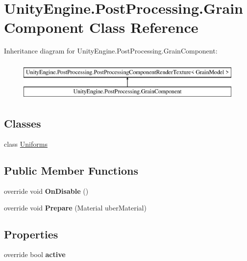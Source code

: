 \hypertarget{class_unity_engine_1_1_post_processing_1_1_grain_component}{}\section{Unity\+Engine.\+Post\+Processing.\+Grain\+Component Class Reference}
\label{class_unity_engine_1_1_post_processing_1_1_grain_component}
Inheritance diagram for Unity\+Engine.\+Post\+Processing.\+Grain\+Component\+:\begin{figure}[H]
\begin{center}
\leavevmode
\includegraphics[height=2.000000cm]{class_unity_engine_1_1_post_processing_1_1_grain_component}
\end{center}
\end{figure}
\subsection*{Classes}
\begin{DoxyCompactItemize}
\item 
class \hyperlink{class_unity_engine_1_1_post_processing_1_1_grain_component_1_1_uniforms}{Uniforms}
\end{DoxyCompactItemize}
\subsection*{Public Member Functions}
\begin{DoxyCompactItemize}
\item 
\mbox{\label{class_unity_engine_1_1_post_processing_1_1_grain_component_a345fbfa8ab350022e79fbcae210c3210}} 
override void {\bfseries On\+Disable} ()
\item 
\mbox{\label{class_unity_engine_1_1_post_processing_1_1_grain_component_a6a1c8bf2f8d860c91df6cf012c63c27a}} 
override void {\bfseries Prepare} (Material uber\+Material)
\end{DoxyCompactItemize}
\subsection*{Properties}
\begin{DoxyCompactItemize}
\item 
\mbox{\label{class_unity_engine_1_1_post_processing_1_1_grain_component_adb5baf66470f91776c51124f01acb3e5}} 
override bool {\bfseries active}
\end{DoxyCompactItemize}
